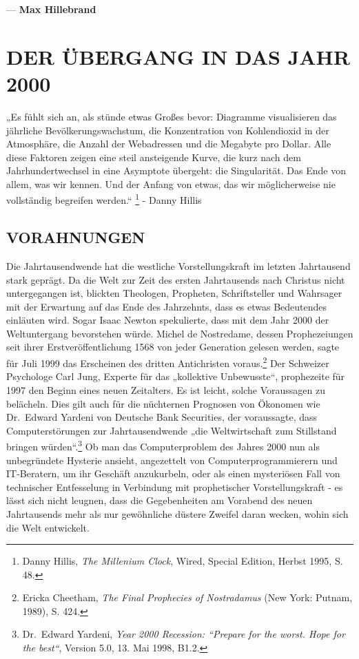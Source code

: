 \documentclass[
  a5paper,
  smalldemyvopaper,10pt,twoside,onecolumn,openright,extrafontsizes,hidelinks]{memoir}
\renewenvironment{quote}%
               {\list{}{\rightmargin=.6cm\leftmargin=.6cm}%
                \itshape \item[]}%
               {\endlist}
\begin{document}
\vspace{2em}

--- \textbf{Max Hillebrand}


\chapter{DER ÜBERGANG IN DAS JAHR
2000}\label{der-uxfcbergang-in-das-jahr-2000}

\begin{quote}
„Es fühlt sich an, als stünde etwas Großes bevor: Diagramme
visualisieren das jährliche Bevölkerungswachstum, die Konzentration von
Kohlendioxid in der Atmosphäre, die Anzahl der Webadressen und die
Megabyte pro Dollar. Alle diese Faktoren zeigen eine steil ansteigende
Kurve, die kurz nach dem Jahrhundertwechsel in eine Asymptote übergeht:
die Singularität. Das Ende von allem, was wir kennen. Und der Anfang von
etwas, das wir möglicherweise nie vollständig begreifen werden.``
\footnote{Danny Hillis, \emph{The Millenium Clock}, Wired, Special
  Edition, Herbst 1995, S. 48.} - Danny Hillis
\end{quote}

\section{VORAHNUNGEN}\label{vorahnungen}

Die Jahrtausendwende hat die westliche Vorstellungskraft im letzten
Jahrtausend stark geprägt. Da die Welt zur Zeit des ersten Jahrtausends
nach Christus nicht untergegangen ist, blickten Theologen, Propheten,
Schriftsteller und Wahrsager mit der Erwartung auf das Ende des
Jahrzehnts, dass es etwas Bedeutendes einläuten wird. Sogar Isaac Newton
spekulierte, dass mit dem Jahr 2000 der Weltuntergang bevorstehen würde.
Michel de Nostredame, dessen Prophezeiungen seit ihrer
Erstveröffentlichung 1568 von jeder Generation gelesen werden, sagte für
Juli 1999 das Erscheinen des dritten Antichristen voraus.\footnote{Ericka
  Cheetham, \emph{The Final Prophecies of Nostradamus} (New York:
  Putnam, 1989), S. 424.} Der Schweizer Psychologe Carl Jung, Experte
für das „kollektive Unbewusste``, prophezeite für 1997 den Beginn eines
neuen Zeitalters. Es ist leicht, solche Voraussagen zu belächeln. Dies
gilt auch für die nüchternen Prognosen von Ökonomen wie Dr.~Edward
Yardeni von Deutsche Bank Securities, der voraussagte, dass
Computerstörungen zur Jahrtausendwende „die Weltwirtschaft zum
Stillstand bringen würden``.\footnote{Dr.~Edward Yardeni, \emph{Year
  2000 Recession: ``Prepare for the worst. Hope for the best``}, Version
  5.0, 13. Mai 1998, B1.2.} Ob man das Computerproblem des Jahres 2000
nun als unbegründete Hysterie ansieht, angezettelt von
Computerprogrammierern und IT-Beratern, um ihr Geschäft anzukurbeln,
oder als einen mysteriösen Fall von technischer Entfesselung in
Verbindung mit prophetischer Vorstellungskraft - es lässt sich nicht
leugnen, dass die Gegebenheiten am Vorabend des neuen Jahrtausends mehr
als nur gewöhnliche düstere Zweifel daran wecken, wohin sich die Welt
entwickelt.
\end{document}
